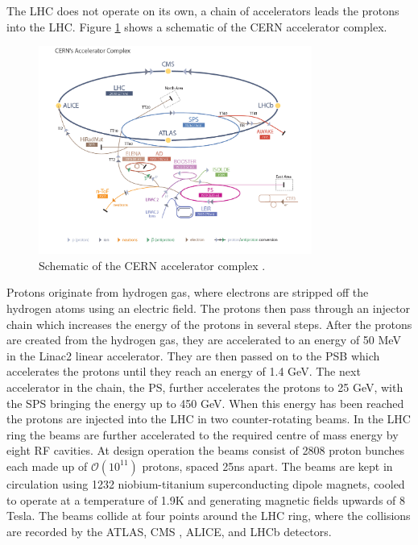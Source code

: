 The \ac{LHC} does not operate on its own, a chain of accelerators leads
the protons into the \ac{LHC}. Figure \ref{fig:lhc_schematic} shows a schematic
of the \ac{CERN} accelerator complex.
\begin{figure}[h!]
\includegraphics[width=0.8\textwidth]{./Detector/Plots/LHC_default.jpg}
\caption{Schematic of the \ac{CERN} accelerator complex \cite{lhc-schematic}.}
\label{fig:lhc_schematic}
\end{figure}
Protons originate from hydrogen gas, where electrons are stripped off the 
hydrogen atoms using an electric field. The protons then pass through an injector
chain which increases the energy of the protons in several steps. After the protons
are created from the hydrogen gas, they are accelerated to an energy of
50 MeV in the Linac2 linear accelerator. They are then passed on to the
\acf{PSB} which accelerates the protons until they reach an energy of 1.4 GeV.
The next accelerator in the chain, the \acf{PS}, further accelerates the protons to 25 GeV,
with the \acf{SPS} bringing the energy up to 450 GeV. When this energy has been 
reached the protons are injected into the \ac{LHC} in two counter-rotating
beams. In the \ac{LHC} ring the beams are further accelerated to the required centre of mass energy
by eight \ac{RF} cavities. At design operation the beams consist of 2808 proton bunches each made up 
of $\mathcal{O}(10^{11})$ protons, spaced 25ns apart. The beams are kept in circulation
using 1232 niobium-titanium superconducting dipole magnets, cooled to operate at 
a temperature of 1.9K and generating magnetic fields upwards of 8 Tesla.
The beams collide at four points
around the \ac{LHC} ring, where the collisions are recorded by the ATLAS\cite{atlas-jinst}, 
CMS%
, ALICE\cite{alice-jinst}, and LHCb\cite{lhcb-jinst} detectors.

